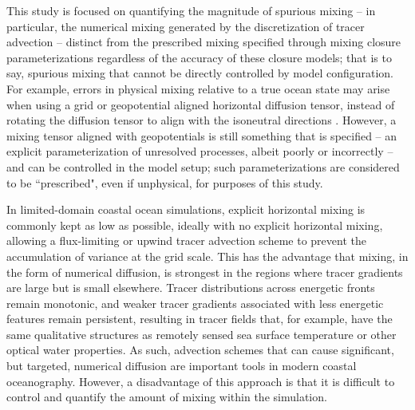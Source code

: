 This study is focused on quantifying the magnitude of spurious mixing -- in particular, the numerical mixing generated by the discretization of tracer advection -- distinct from the prescribed mixing specified through mixing closure parameterizations regardless of the accuracy of these closure models; that is to say, spurious mixing that cannot be directly controlled by model configuration. For example, errors in physical mixing relative to a true ocean state may arise when using a grid or geopotential aligned horizontal diffusion tensor, instead of rotating the diffusion tensor to align with the isoneutral directions \citep{griffies1998isoneutral, redi1982oceanic}. However, a mixing tensor aligned with geopotentials is still something that is specified --  an explicit parameterization of unresolved processes, albeit poorly or incorrectly -- and can be controlled in the model setup; such parameterizations are considered to be ``prescribed", even if unphysical, for purposes of this study.

In limited-domain coastal ocean simulations, explicit horizontal mixing is commonly kept as low as possible, ideally with no explicit horizontal mixing, allowing a flux-limiting \citep{Smolarkiewicz_1998} or upwind \citep{shchepetkin1998quasi} tracer advection scheme to prevent the accumulation of variance at the grid scale. This has the advantage that mixing, in the form of numerical diffusion, is strongest in the regions where tracer gradients are large but is small elsewhere. Tracer distributions across energetic fronts remain monotonic, and weaker tracer gradients associated with less energetic features remain persistent, resulting in tracer fields that, for example, have the same qualitative structures as remotely sensed sea surface temperature or other optical water properties. As such, advection schemes that can cause significant, but targeted, numerical diffusion are important tools in modern coastal oceanography. However, a disadvantage of this approach is that it is difficult to control and quantify the amount of mixing within the simulation.

